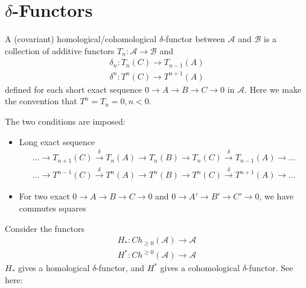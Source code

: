 \documentclass[Total.tex]{subfiles}
\begin{document}
		\section{$\delta$-Functors}
			\begin{Def}
				A (covariant) homological/cohomological $\delta$-functor between $\mathcal{A}$ and $\mathcal{B}$ is a collection of additive functors $T_n:\mathcal{A}\rightarrow \mathcal{B}$ and
				\begin{gather*}
					\delta_n:T_n(C)\rightarrow T_{n-1}(A)\\
					\delta^n:T^n(C)\rightarrow T^{n+1}(A)
				\end{gather*}
				defined for each short exact sequence $0\rightarrow A\rightarrow B\rightarrow C\rightarrow 0$ in $\mathcal{A}$. Here we make the convention that $T^n=T_n=0,n<0$. 
			\end{Def}
			The two conditions are imposed:
			\begin{itemize}
				\item Long exact sequence
				\begin{gather*}
					\dots\rightarrow T_{n+1}(C)\stackrel{\delta}{\rightarrow} T_n(A)\rightarrow T_n(B)\rightarrow T_n(C)\stackrel{\delta}{\rightarrow}T_{n-1}(A)\rightarrow \dots\\
					\dots\rightarrow T^{n-1}(C)\stackrel{\delta}{\rightarrow} T^n(A)\rightarrow T^n(B)\rightarrow T^n(C)\stackrel{\delta}{\rightarrow}T^{n+1}(A)\rightarrow \dots
				\end{gather*}
				\item For two exact $0\rightarrow A\rightarrow B\rightarrow C\rightarrow 0$ and $0\rightarrow A'\rightarrow B'\rightarrow C'\rightarrow 0$, we have commutes squares
				\begin{center}
				\end{center}
			\end{itemize}
			\begin{example}
				Consider the functors 
				\begin{gather*}
					H_*:Ch_{\geq 0}(\mathcal{A})\rightarrow\mathcal{A}\\
					H^*:Ch^{\geq 0}(\mathcal{A})\rightarrow \mathcal{A} 
				\end{gather*}
				$H_*$ gives a homological $\delta$-functor, and $H^*$ gives a cohomological $\delta$-functor. See here:
			\end{example}
\end{document}
